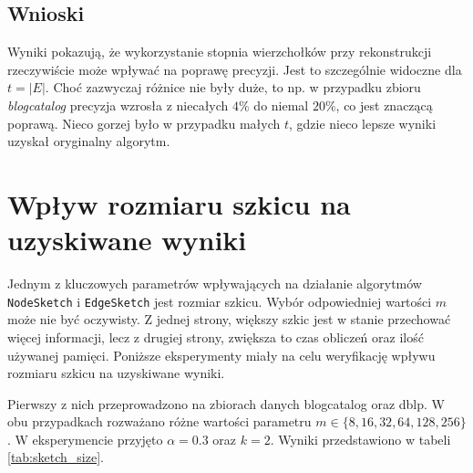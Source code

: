     \subsection{Wnioski}
    Wyniki pokazują, że wykorzystanie stopnia wierzchołków przy rekonstrukcji rzeczywiście może wpływać na poprawę precyzji. Jest to szczególnie widoczne dla $t = |E|$. Choć zazwyczaj różnice nie były duże, to np. w przypadku zbioru \emph{blogcatalog} precyzja wzrosła z niecałych $4\%$ do niemal $20\%$, co jest znaczącą poprawą. Nieco gorzej było w przypadku małych $t$, gdzie nieco lepsze wyniki uzyskał oryginalny algorytm.

\section{Wpływ rozmiaru szkicu na uzyskiwane wyniki}
    Jednym z kluczowych parametrów wpływających na działanie algorytmów \texttt{NodeSketch} i \texttt{EdgeSketch} jest rozmiar szkicu. Wybór odpowiedniej wartości $m$ może nie być oczywisty. Z jednej strony, większy szkic jest w stanie przechować więcej informacji, lecz z drugiej strony, zwiększa to czas obliczeń oraz ilość używanej pamięci. Poniższe eksperymenty miały na celu weryfikację wpływu rozmiaru szkicu na uzyskiwane wyniki.

    Pierwszy z nich przeprowadzono na zbiorach danych blogcatalog oraz dblp. W obu przypadkach rozważano różne wartości parametru $m \in \{8, 16, 32, 64, 128, 256\}$. W eksperymencie przyjęto $\alpha = 0.3$ oraz $k = 2$. Wyniki przedstawiono w tabeli \ref{tab:sketch_size}.

